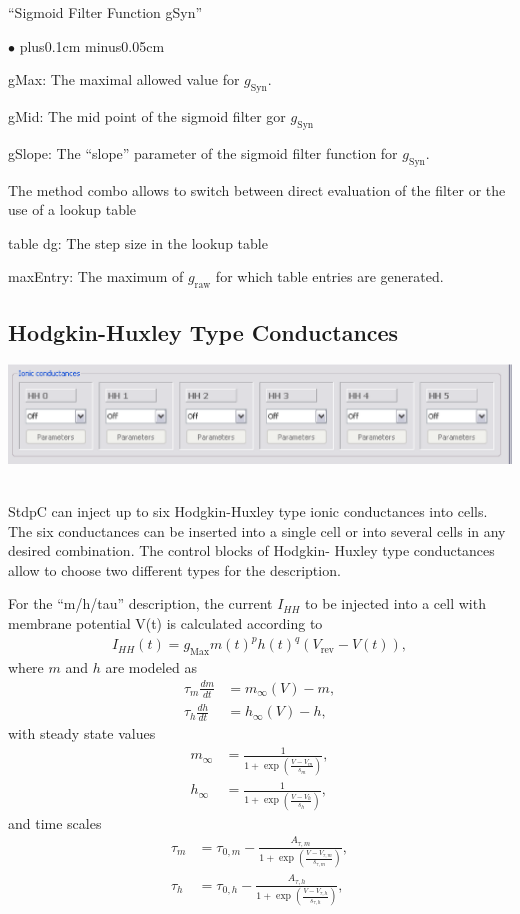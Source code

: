 \documentclass{article}
\newenvironment{myitem}{\begin{list}{$\bullet$}{\setlength{\leftmargin}{1.1em}
\itemsep0.1cm plus0.1cm minus0.05cm
\listparindent0cm
\addtolength{\labelsep}{0.5\labelsep}
\setlength{\labelwidth}{0.8em}
\setlength{\leftmargin}{\labelwidth}
\addtolength{\leftmargin}{\labelsep}
}}{\end{list}}
\begin{document}
``Sigmoid Filter Function gSyn''
\begin{myitem}
\item gMax: The maximal allowed value for $g_{\text{Syn}}$.
\item gMid: The mid point of the sigmoid filter gor $g_{\text{Syn}}$
\item gSlope: The ``slope'' parameter of the sigmoid filter function
  for $g_{\text{Syn}}$.
\item The method combo allows to switch between direct evaluation of
  the filter or the use of a lookup table
\item table dg: The step size in the lookup table
\item maxEntry: The maximum of $g_{\text{raw}}$ for which table
  entries are generated.
\end{myitem}  
\subsection{Hodgkin-Huxley Type Conductances}

\parbox{\textwidth}{
  \includegraphics[scale=0.5]{HHBlock}
} \\[0.2cm]
 
StdpC can inject up to six Hodgkin-Huxley type ionic conductances into
cells. The six conductances can be inserted into a single cell
or into several cells in any desired combination. The control blocks
of Hodgkin- Huxley type conductances allow to choose two different
types for the description.

For the ``m/h/tau'' description, the current $I_{HH}$ to be injected
into a cell with membrane potential V(t) is calculated according to
\begin{align}
  I_{HH}(t) = g_{\text{Max}} m(t)^p h(t)^q (V_{\text{rev}}-V(t)),
\end{align}
where $m$ and $h$ are modeled as
\begin{align}
  \tau_m \frac{dm}{dt} &= m_\infty(V)-m , \\
  \tau_h \frac{dh}{dt} &= h_\infty(V)- h, 
\end{align}
with steady state values
\begin{align}
  m_\infty &= \frac{1}{1+\exp \left(\frac{V - V_m}{s_m}
  \right)}, \\
  h_\infty &= \frac{1}{1+\exp \left(\frac{V - V_h}{s_h}
  \right)}, 
\end{align}
and time scales 
\begin{align}
  \tau_m &= \tau_{0,m} - 
  \frac{A_{\tau,m}}{1+\exp\left(\frac{V-V_{\tau,m}}{s_{\tau,m}}\right)}, \\
  \tau_h &= \tau_{0,h} - 
  \frac{A_{\tau,h}}{1+\exp\left(\frac{V-V_{\tau,h}}{s_{\tau,h}}\right)}, 
\end{align}
  
\end{document}
